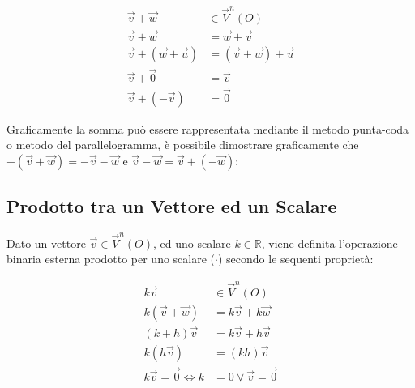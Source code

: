 \documentclass{article}
\numberwithin{equation}{subsection}
\begin{document}
\begin{align}
    \vec{v} + \vec{w} &\in \vec{V}^{n}\left(O\right)\\
    \vec{v} + \vec{w} &= \vec{w} + \vec{v}\\
    \vec{v} + \left(\vec{w} + \vec{u}\right) &= \left(\vec{v} + \vec{w}\right) + \vec{u}\\
    \vec{v} + \vec{0} &= \vec{v}\\ 
    \vec{v} + (-\vec{v}) &= \vec{0}
\end{align}

Graficamente la somma può essere rappresentata mediante il 
metodo punta-coda o metodo del parallelogramma, è
possibile dimostrare graficamente che 
$-\left(\vec{v} + \vec{w}\right) = -\vec{v} -\vec{w}$ e
$ \vec{v} - \vec{w} = \vec{v} + \left(-\vec{w}\right)$:

\begin{center}\end{center}

\subsection{Prodotto tra un Vettore ed un Scalare}
Dato un vettore $\vec{v}\in\vec{V}^{n}{\left(O\right)}$, ed uno scalare $k\in\mathbb{R}$, viene definita l'operazione binaria esterna prodotto per uno scalare ($\cdot$) secondo le sequenti proprietà:

\begin{align}
    k\vec{v} &\in\vec{V}^{n}{\left(O\right)}\\
    k\left(\vec{v} +\vec{w}\right)&= k\vec{v} + k\vec{w}\\
    \left(k + h\right)\vec{v} &= k\vec{v} + h\vec{v}\\
    k\left(h\vec{v}\right) &= \left(kh\right)\vec{v}\\
    k\vec{v} = \vec{0} \iff k &= 0 \lor \vec{v} = \vec{0}
\end{align}
\end{document}
